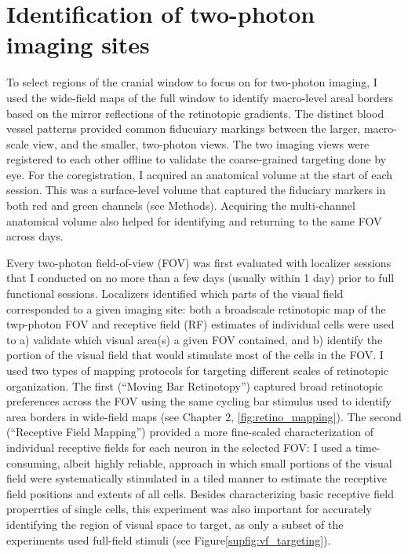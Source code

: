 \section{Identification of two-photon imaging sites}
To select regions of the cranial window to focus on for two-photon imaging, I used the wide-field maps of the full window to identify macro-level areal borders based on the mirror reflections of the retinotopic gradients. The distinct blood vessel patterns provided common fiducuiary markings between the larger, macro-scale view, and the smaller, two-photon views. The two imaging views were registered to each other offline to validate the coarse-grained targeting done by eye. For the coregistration, I acquired an anatomical volume at the start of each session. This was a surface-level volume that captured the fiduciary markers in both red and green channels (see Methods). Acquiring the multi-channel anatomical volume also helped for identifying and returning to the same FOV across days. 

Every two-photon field-of-view (FOV) was first evaluated with localizer sessions that I conducted on no more than a few days (usually within 1 day) prior to full functional sessions. Localizers identified which parts of the visual field corresponded to a given imaging site: both a broadscale retinotopic map of the twp-photon FOV and receptive field (RF) estimates of individual cells were used to a) validate which visual area(s) a given FOV contained, and b) identify the portion of the visual field that would stimulate most of the cells in the FOV. I used two types of mapping protocols for targeting different scales of retinotopic organization. The first (``Moving Bar Retinotopy'') captured broad retinotopic preferences across the FOV using the same cycling bar stimulus used to identify area borders in wide-field maps (see Chapter 2, \ref{fig:retino_mapping}). The second (``Receptive Field Mapping'') provided a more fine-scaled characterization of individual receptive fields for each neuron in the selected FOV:  I used a time-consuming, albeit highly reliable, approach in which small portions of the visual field were systematically stimulated in a tiled manner to estimate the receptive field positions and extents of all cells. Besides characterizing basic receptive field properrties of single cells, this experiment was also important for accurately identifying the region of visual space to target, as only a subset of the experiments used full-field stimuli (see Figure\ref{supfig:vf_targeting}).

